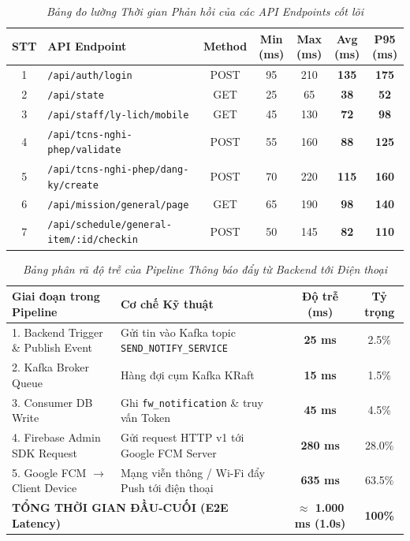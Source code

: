 \begin{table}[H]
\centering
\renewcommand{\arraystretch}{1.2}
\begin{tabularx}{\textwidth}{|c|p{4.2cm}|c|c|c|c|c|}
\hline
\textbf{STT} & \textbf{API Endpoint} & \textbf{Method} & \textbf{Min (ms)} & \textbf{Max (ms)} & \textbf{Avg (ms)} & \textbf{P95 (ms)} \\
\hline
1 & \texttt{/api/auth/login} & POST & 95 & 210 & \textbf{135} & \textbf{175} \\
\hline
2 & \texttt{/api/state} & GET & 25 & 65 & \textbf{38} & \textbf{52} \\
\hline
3 & \texttt{/api/staff/ly-lich/mobile} & GET & 45 & 130 & \textbf{72} & \textbf{98} \\
\hline
4 & \texttt{/api/tcns-nghi-phep/validate} & POST & 55 & 160 & \textbf{88} & \textbf{125} \\
\hline
5 & \texttt{/api/tcns-nghi-phep/dang-ky/create} & POST & 70 & 220 & \textbf{115} & \textbf{160} \\
\hline
6 & \texttt{/api/mission/general/page} & GET & 65 & 190 & \textbf{98} & \textbf{140} \\
\hline
7 & \texttt{/api/schedule/general-item/:id/checkin} & POST & 50 & 145 & \textbf{82} & \textbf{110} \\
\hline
\end{tabularx}
\caption{\textit{Bảng đo lường Thời gian Phản hồi của các API Endpoints cốt lõi}}
\label{tab:api_benchmarks}
\end{table}

\begin{table}[H]
\centering
\renewcommand{\arraystretch}{1.2}
\begin{tabularx}{\textwidth}{|p{5.5cm}|X|c|c|}
\hline
\textbf{Giai đoạn trong Pipeline} & \textbf{Cơ chế Kỹ thuật} & \textbf{Độ trễ (ms)} & \textbf{Tỷ trọng} \\
\hline
1. Backend Trigger \& Publish Event & Gửi tin vào Kafka topic \texttt{SEND\_NOTIFY\_SERVICE} & \textbf{25 ms} & 2.5\% \\
\hline
2. Kafka Broker Queue & Hàng đợi cụm Kafka KRaft & \textbf{15 ms} & 1.5\% \\
\hline
3. Consumer DB Write & Ghi \texttt{fw\_notification} \& truy vấn Token & \textbf{45 ms} & 4.5\% \\
\hline
4. Firebase Admin SDK Request & Gửi request HTTP v1 tới Google FCM Server & \textbf{280 ms} & 28.0\% \\
\hline
5. Google FCM $\rightarrow$ Client Device & Mạng viễn thông / Wi-Fi đẩy Push tới điện thoại & \textbf{635 ms} & 63.5\% \\
\hline
\multicolumn{2}{|l|}{\textbf{TỔNG THỜI GIAN ĐẦU-CUỐI (E2E Latency)}} & \textbf{$\approx$ 1.000 ms (1.0s)} & \textbf{100\%} \\
\hline
\end{tabularx}
\caption{\textit{Bảng phân rã độ trễ của Pipeline Thông báo đẩy từ Backend tới Điện thoại}}
\label{tab:fcm_latency}
\end{table}


